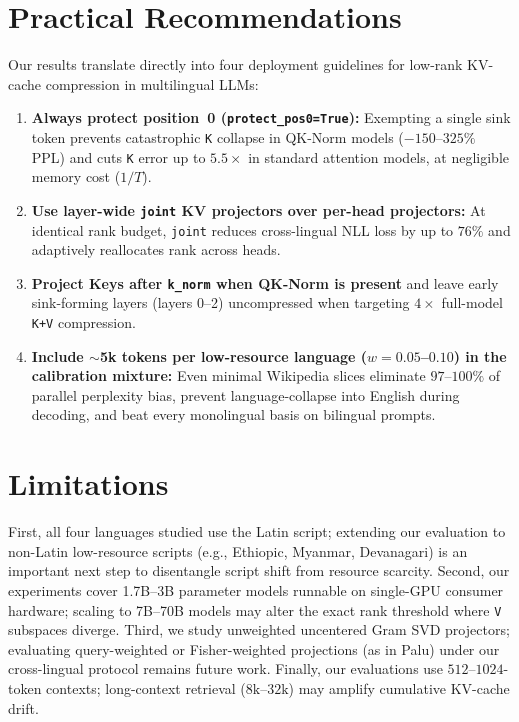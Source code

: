 \documentclass[11pt,a4paper,twocolumn]{article}
\begin{document}
\section{Practical Recommendations}
Our results translate directly into four deployment guidelines for low-rank KV-cache compression in multilingual LLMs:
\begin{enumerate}
  \item \textbf{Always protect position~0 (\texttt{protect\_pos0=True}):} Exempting a single sink token prevents catastrophic \texttt{K} collapse in QK-Norm models ($-150$--$325\%$ PPL) and cuts \texttt{K} error up to $5.5\times$ in standard attention models, at negligible memory cost ($1/T$).
  \item \textbf{Use layer-wide \texttt{joint} KV projectors over per-head projectors:} At identical rank budget, \texttt{joint} reduces cross-lingual NLL loss by up to $76\%$ and adaptively reallocates rank across heads.
  \item \textbf{Project Keys after \texttt{k\_norm} when QK-Norm is present} and leave early sink-forming layers (layers 0--2) uncompressed when targeting $4\times$ full-model \texttt{K+V} compression.
  \item \textbf{Include $\sim$5k tokens per low-resource language ($w=0.05$--$0.10$) in the calibration mixture:} Even minimal Wikipedia slices eliminate $97$--$100\%$ of parallel perplexity bias, prevent language-collapse into English during decoding, and beat every monolingual basis on bilingual prompts.
\end{enumerate}

\section{Limitations}
First, all four languages studied use the Latin script; extending our evaluation to non-Latin low-resource scripts (e.g., Ethiopic, Myanmar, Devanagari) is an important next step to disentangle script shift from resource scarcity. Second, our experiments cover 1.7B--3B parameter models runnable on single-GPU consumer hardware; scaling to 7B--70B models may alter the exact rank threshold where \texttt{V} subspaces diverge. Third, we study unweighted uncentered Gram SVD projectors; evaluating query-weighted or Fisher-weighted projections (as in Palu) under our cross-lingual protocol remains future work. Finally, our evaluations use $512$--$1024$-token contexts; long-context retrieval ($8\text{k}$--$32\text{k}$) may amplify cumulative KV-cache drift.
\end{document}
